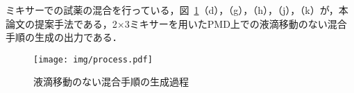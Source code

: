 ミキサーでの試薬の混合を行っている，図~\ref{fig:process}（d），（g），（h），（j），（k）が，本論文の提案手法である，2$\times$3ミキサーを用いたPMD上での液滴移動のない混合手順の生成の出力である．
\begin{figure}[tbp]
 \centering\texttt{[image: img/process.pdf]}
 \caption{液滴移動のない混合手順の生成過程}\label{fig:process}
\end{figure}






